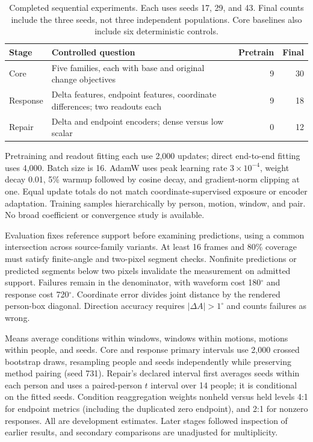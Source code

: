 \documentclass{article}
\newcommand{\degunit}{^{\circ}}
\begin{document}
\begin{table}[h]\centering\small
\caption{Completed sequential experiments. Each uses seeds 17, 29, and 43. Final counts include the three seeds, not three independent populations. Core baselines also include six deterministic controls.}
\label{tab:matrix}
\begin{tabular}{p{.85in}p{3.0in}rr}\toprule
Stage & Controlled question & Pretrain & Final\\\midrule
Core & Five families, each with base and original change objectives &9&30\\
Response & Delta features, endpoint features, coordinate differences; two readouts each &9&18\\
Repair & Delta and endpoint encoders; dense versus low scalar &0&12\\\bottomrule
\end{tabular}\end{table}

Pretraining and readout fitting each use 2,000 updates; direct end-to-end fitting uses 4,000. Batch size is 16. AdamW uses peak learning rate $3\times10^{-4}$, weight decay 0.01, 5\% warmup followed by cosine decay, and gradient-norm clipping at one. Equal update totals do not match coordinate-supervised exposure or encoder adaptation. Training samples hierarchically by person, motion, window, and pair. No broad coefficient or convergence study is available.

Evaluation fixes reference support before examining predictions, using a common intersection across source-family variants. At least 16 frames and 80\% coverage must satisfy finite-angle and two-pixel segment checks. Nonfinite predictions or predicted segments below two pixels invalidate the measurement on admitted support. Failures remain in the denominator, with waveform cost 180$\degunit$ and response cost 720$\degunit$. Coordinate error divides joint distance by the rendered person-box diagonal. Direction accuracy requires $|\Delta A|>1\degunit$ and counts failures as wrong.

Means average conditions within windows, windows within motions, motions within people, and seeds. Core and response primary intervals use 2,000 crossed bootstrap draws, resampling people and seeds independently while preserving method pairing (seed 731). Repair's declared interval first averages seeds within each person and uses a paired-person $t$ interval over 14 people; it is conditional on the fitted seeds. Condition reaggregation weights nonheld versus held levels 4:1 for endpoint metrics (including the duplicated zero endpoint), and 2:1 for nonzero responses. All are development estimates. Later stages followed inspection of earlier results, and secondary comparisons are unadjusted for multiplicity.
\end{document}
